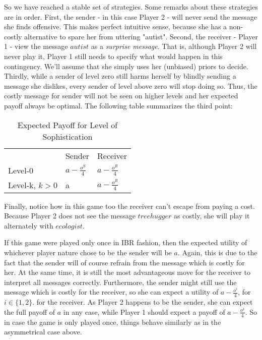 \documentclass[10]{article}
\begin{document}
So we have reached a stable set of strategies. Some remarks about these strategies are in order. First, the sender - in this case Player 2 - will never send the message she finds offensive. This makes perfect intuitive sense, because she has a non-costly alternative to spare her from uttering "autist". Second, the receiver - Player 1 - view the message $autist$ as a \textit{surprise message}. That is, although Player 2 will never play it, Player 1 still needs to specify what would happen in this contingency. We'll assume that she simply uses her (unbiased) priors to decide.
Thirdly, while a sender of level zero still harms herself by blindly sending a message she dislikes, every sender of level above zero will stop doing so. Thus, the costly message for sender will not be seen on higher levels and her expected payoff  always be optimal.
The following table summarizes the third point:
\begin{table}[h]
\centering
\caption{Expected Payoff for Level of Sophistication}
\label{my-label}
\begin{tabular}{lll}
                                    & Sender                                  & Receiver                                \\ \cline{2-3} 
\multicolumn{1}{l|}{Level-0}        & \multicolumn{1}{l|}{$a-\tfrac{o^S}{4}$} & \multicolumn{1}{l|}{$a-\tfrac{o^R}{4}$} \\ \cline{2-3} 
\multicolumn{1}{l|}{Level-k, $k>0$} & \multicolumn{1}{l|}{a}                  & \multicolumn{1}{l|}{$a-\tfrac{o^R}{4}$} \\ \cline{2-3} 
\end{tabular}
\end{table}

Finally, notice how in this game too the receiver can't escape from paying a cost. Because Player 2 does not see the message $treehugger$ as costly, she will play it alternately with $ecologist$.

If this game were played only once in IBR fashion, then the expected utility of whichever player nature chose to be the sender will be $a$. Again, this is due to the fact that the sender will of course refrain from the message which is costly for her. At the same time, it is still the most advantageous move for the receiver to interpret all messages correctly. Furthermore, the sender might still use the message which is costly for the receiver, so she can expect a utility of $a-\tfrac{o^i}{4}$, for $i\in \{1,2\}$. for the receiver. As Player 2 happens to be the sender, she can expect the full payoff of $a$ in any case, while Player 1 should expect a payoff of $a-\tfrac{o^1}{4}$. So in case the game is only played once, things behave similarly as in the asymmetrical case above.
\end{document}
